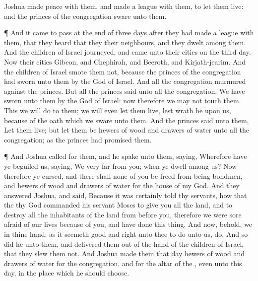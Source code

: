 {Joshua
made
peace with them, and
made a
league with them, to let them
live: and the
princes of the
congregation
sware unto them.
\par }{\PP {}¶ And it came to pass at the
end of
three
days
after they had
made a
league with them, that they
heard that they
{} their
neighbours, and
{} they
dwelt
among them.
And the
children of
Israel
journeyed, and
came unto their
cities on the
third
day. Now their
cities
{}
Gibeon, and
Chephirah, and
Beeroth, and
Kirjath-jearim.
And the
children of
Israel
smote them not, because the
princes of the
congregation had
sworn unto them by the
{}
God of
Israel. And all the
congregation
murmured against the
princes.
But all the
princes
said unto all the
congregation, We have
sworn unto them by the
{}
God of
Israel: now therefore we
may not
touch them.
This we will
do to them; we will even let them
live, lest
wrath be upon us, because of the
oath which we
sware unto them.
And the
princes
said unto them, Let them
live; but let them be
hewers of
wood and
drawers of
water unto all the
congregation; as the
princes had
promised them.
\par }{\PP {}¶ And
Joshua
called for them, and he
spake unto them,
saying, Wherefore have ye
beguiled us,
saying, We
{}
very
far from you; when ye
dwell
among us?
Now therefore ye
{}
cursed, and there shall none of you be
freed from being
bondmen, and
hewers of
wood and
drawers of
water for the
house of my
God.
And they
answered
Joshua, and
said, Because it was
certainly
told thy
servants, how that the
{} thy
God
commanded his
servant
Moses to
give you all the
land, and to
destroy all the
inhabitants of the
land from
before you, therefore we were
sore
afraid of our
lives
because of you, and have
done this
thing.
And now, behold,
we
{} in thine
hand: as it
seemeth
good and
right unto thee to
do unto us,
do.
And so
did he unto them, and
delivered them out of the
hand of the
children of
Israel, that they
slew them not.
And
Joshua
made them that
day
hewers of
wood and
drawers of
water for the
congregation, and for the
altar of the
{}, even unto this
day, in the
place which he should
choose.

}

